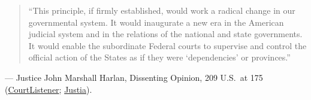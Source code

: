 \documentclass[12pt]{article}
\begin{document}
\begin{quote}
``This principle, if firmly established, would work a radical change in our governmental system. It would inaugurate a new era in the American judicial system and in the relations of the national and state governments. It would enable the subordinate Federal courts to supervise and control the official action of the States as if they were `dependencies' or provinces.''
\end{quote}
\noindent --- Justice John Marshall Harlan, Dissenting Opinion, 209 U.S.\ at 175 (\href{https://www.courtlistener.com/opinion/96819/ex-parte-young/}{CourtListener}; \href{https://supreme.justia.com/cases/federal/us/209/123/}{Justia}).
\end{document}
